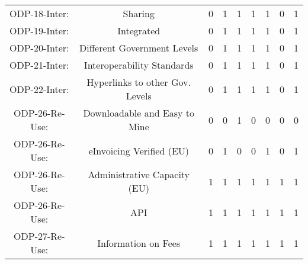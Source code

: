 \documentclass[a4paper, twoside]{report}
\begin{document}
\begin{table}[htbp]
\begin{adjustbox}{max width=\linewidth}
\begin{tabular}{rcccccccc}
    \multicolumn{1}{c}{ODP-18-Inter:} & \multicolumn{1}{p{19em}}{Sharing} & 0     & 1     & 1     & 1     & 1     & 0     & 1 \\
    \multicolumn{1}{c}{ODP-19-Inter:} & \multicolumn{1}{p{19em}}{Integrated} & 0     & 1     & 1     & 1     & 1     & 0     & 1 \\
    \multicolumn{1}{c}{ODP-20-Inter:} & \multicolumn{1}{p{19em}}{Different Government Levels} & 0     & 1     & 1     & 1     & 1     & 0     & 1 \\
    \multicolumn{1}{c}{ODP-21-Inter:} & \multicolumn{1}{p{19em}}{\cellcolor[rgb]{ .749,  .749,  .749}Interoperability Standards} & \cellcolor[rgb]{ .749,  .749,  .749}0 & \cellcolor[rgb]{ .749,  .749,  .749}1 & \cellcolor[rgb]{ .749,  .749,  .749}1 & \cellcolor[rgb]{ .749,  .749,  .749}1 & \cellcolor[rgb]{ .749,  .749,  .749}1 & \cellcolor[rgb]{ .749,  .749,  .749}0 & \cellcolor[rgb]{ .749,  .749,  .749}1 \\
    \multicolumn{1}{c}{ODP-22-Inter:} & \multicolumn{1}{p{19em}}{\cellcolor[rgb]{ .749,  .749,  .749}Hyperlinks to other Gov. Levels} & \cellcolor[rgb]{ .749,  .749,  .749}0 & \cellcolor[rgb]{ .749,  .749,  .749}1 & \cellcolor[rgb]{ .749,  .749,  .749}1 & \cellcolor[rgb]{ .749,  .749,  .749}1 & \cellcolor[rgb]{ .749,  .749,  .749}1 & \cellcolor[rgb]{ .749,  .749,  .749}0 & \cellcolor[rgb]{ .749,  .749,  .749}1 \\
    \midrule
    \multicolumn{1}{c}{ODP-26-Re-Use:} & \multicolumn{1}{p{19em}}{Downloadable and Easy to Mine} & 0     & 0     & 1     & 0     & 0     & 0     & 0 \\
    \multicolumn{1}{c}{ODP-26-Re-Use:} & \multicolumn{1}{p{19em}}{\cellcolor[rgb]{ .749,  .749,  .749}eInvoicing Verified (EU)} & \cellcolor[rgb]{ .749,  .749,  .749}0 & \cellcolor[rgb]{ .749,  .749,  .749}1 & \cellcolor[rgb]{ .749,  .749,  .749}0 & \cellcolor[rgb]{ .749,  .749,  .749}0 & \cellcolor[rgb]{ .749,  .749,  .749}1 & \cellcolor[rgb]{ .749,  .749,  .749}0 & \cellcolor[rgb]{ .749,  .749,  .749}1 \\
    \multicolumn{1}{c}{ODP-26-Re-Use:} & \multicolumn{1}{p{19em}}{Administrative Capacity (EU)} & 1     & 1     & 1     & 1     & 1     & 1     & 1 \\
    \multicolumn{1}{c}{ODP-26-Re-Use:} & \multicolumn{1}{p{19em}}{API} & 1     & 1     & 1     & 1     & 1     & 1     & 1 \\
    \multicolumn{1}{c}{ODP-27-Re-Use:} & \multicolumn{1}{p{19em}}{\cellcolor[rgb]{ .749,  .749,  .749}Information on Fees} & \cellcolor[rgb]{ .749,  .749,  .749}1 & \cellcolor[rgb]{ .749,  .749,  .749}1 & \cellcolor[rgb]{ .749,  .749,  .749}1 & \cellcolor[rgb]{ .749,  .749,  .749}1 & \cellcolor[rgb]{ .749,  .749,  .749}1 & \cellcolor[rgb]{ .749,  .749,  .749}1 & \cellcolor[rgb]{ .749,  .749,  .749}1 \\

\end{tabular}
\end{adjustbox}
\end{table}
\end{document}
